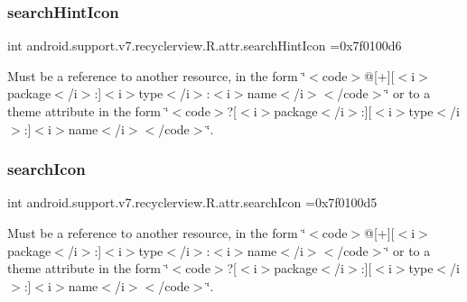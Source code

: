 \subsubsection{\texorpdfstring{search\+Hint\+Icon}{searchHintIcon}}
{\footnotesize\ttfamily int android.\+support.\+v7.\+recyclerview.\+R.\+attr.\+search\+Hint\+Icon =0x7f0100d6\hspace{0.3cm}{\ttfamily [static]}}

Must be a reference to another resource, in the form \char`\"{}$<$code$>$@\mbox{[}+\mbox{]}\mbox{[}$<$i$>$package$<$/i$>$\+:\mbox{]}$<$i$>$type$<$/i$>$\+:$<$i$>$name$<$/i$>$$<$/code$>$\char`\"{} or to a theme attribute in the form \char`\"{}$<$code$>$?\mbox{[}$<$i$>$package$<$/i$>$\+:\mbox{]}\mbox{[}$<$i$>$type$<$/i$>$\+:\mbox{]}$<$i$>$name$<$/i$>$$<$/code$>$\char`\"{}. \mbox{\label{classandroid_1_1support_1_1v7_1_1recyclerview_1_1R_1_1attr_ad0ab7b7b9698816f21b04e3f5dd1f3ed}} 
\subsubsection{\texorpdfstring{search\+Icon}{searchIcon}}
{\footnotesize\ttfamily int android.\+support.\+v7.\+recyclerview.\+R.\+attr.\+search\+Icon =0x7f0100d5\hspace{0.3cm}{\ttfamily [static]}}

Must be a reference to another resource, in the form \char`\"{}$<$code$>$@\mbox{[}+\mbox{]}\mbox{[}$<$i$>$package$<$/i$>$\+:\mbox{]}$<$i$>$type$<$/i$>$\+:$<$i$>$name$<$/i$>$$<$/code$>$\char`\"{} or to a theme attribute in the form \char`\"{}$<$code$>$?\mbox{[}$<$i$>$package$<$/i$>$\+:\mbox{]}\mbox{[}$<$i$>$type$<$/i$>$\+:\mbox{]}$<$i$>$name$<$/i$>$$<$/code$>$\char`\"{}. \mbox{\label{classandroid_1_1support_1_1v7_1_1recyclerview_1_1R_1_1attr_a3a617212305851606283bce3e5a054cd}} 

